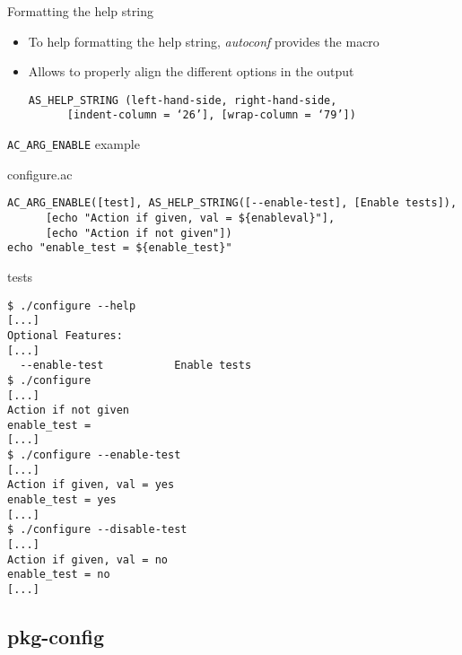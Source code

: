 \begin{frame}[fragile]{Formatting the help string}
  \begin{itemize}
  \item To help formatting the help string, {\em autoconf} provides
    the  macro
  \item Allows to properly align the different options in the
     output
\begin{block}{}
\begin{verbatim}
AS_HELP_STRING (left-hand-side, right-hand-side,
      [indent-column = ‘26’], [wrap-column = ‘79’])
\end{verbatim}
\end{block}
  \end{itemize}
\end{frame}

\begin{frame}[fragile]{{\tt AC\_ARG\_ENABLE} example}

\begin{block}{configure.ac}
\begin{verbatim}
AC_ARG_ENABLE([test], AS_HELP_STRING([--enable-test], [Enable tests]),
      [echo "Action if given, val = ${enableval}"],
      [echo "Action if not given"])
echo "enable_test = ${enable_test}"
\end{verbatim}
\end{block}

\begin{block}{ tests}
\begin{verbatim}
$ ./configure --help
[...]
Optional Features:
[...]
  --enable-test           Enable tests
$ ./configure
[...]
Action if not given
enable_test = 
[...]
$ ./configure --enable-test
[...]
Action if given, val = yes
enable_test = yes
[...]
$ ./configure --disable-test
[...]
Action if given, val = no
enable_test = no
[...]
\end{verbatim}
\end{block}

\end{frame}

\subsection{pkg-config}

